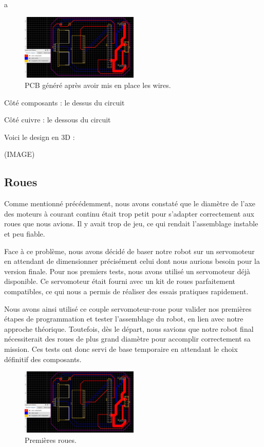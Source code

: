 \documentclass[a4paper,12pt]{report}  %
\begin{document}
a

\begin{figure}[H]
	\centering
	\includegraphics[width=0.5\textwidth]{./attachments/schema_pcb.jpg}
    \caption{PCB généré après avoir mis en place les wires.}
\end{figure}

Côté composants : le dessus du circuit 

Côté cuivre : le dessous du circuit

Voici le design en 3D : 

(IMAGE)


\subsection{Roues}

Comme mentionné précédemment, nous avons constaté que le diamètre de l’axe des moteurs à courant continu était trop petit pour s’adapter correctement aux roues que nous avions. Il y avait trop de jeu, ce qui rendait l’assemblage instable et peu fiable.

Face à ce problème, nous avons décidé de baser notre robot sur un servomoteur en attendant de dimensionner précisément celui dont nous aurions besoin pour la version finale. Pour nos premiers tests, nous avons utilisé un servomoteur déjà disponible. Ce servomoteur était fourni avec un kit de roues parfaitement compatibles, ce qui nous a permis de réaliser des essais pratiques rapidement.

Nous avons ainsi utilisé ce couple servomoteur-roue pour valider nos premières étapes de programmation et tester l’assemblage du robot, en lien avec notre approche théorique. Toutefois, dès le départ, nous savions que notre robot final nécessiterait des roues de plus grand diamètre pour accomplir correctement sa mission. Ces tests ont donc servi de base temporaire en attendant le choix définitif des composants.

\begin{figure}[H]
	\centering
	\includegraphics[width=0.5\textwidth]{./attachments/schema_pcb.jpg}
	\caption{Premières roues.}
\end{figure}
\end{document}
